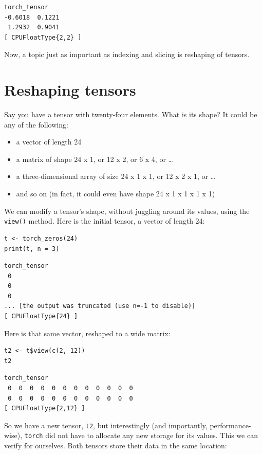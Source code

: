 \documentclass[
  letterpaper,
]{krantz}
\begin{document}
\begin{verbatim}
torch_tensor
-0.6018  0.1221
 1.2932  0.9041
[ CPUFloatType{2,2} ]
\end{verbatim}

Now, a topic just as important as indexing and slicing is reshaping of
tensors.

\hypertarget{reshaping-tensors}{%
\section{\texorpdfstring{Reshaping
tensors}{Reshaping tensors}}\label{reshaping-tensors}}

Say you have a tensor with twenty-four elements. What is its shape? It
could be any of the following:

\begin{itemize}
\item
  a vector of length 24
\item
  a matrix of shape 24 x 1, or 12 x 2, or 6 x 4, or \ldots{}
\item
  a three-dimensional array of size 24 x 1 x 1, or 12 x 2 x 1, or
  \ldots{}
\item
  and so on (in fact, it could even have shape 24 x 1 x 1 x 1 x 1)
\end{itemize}

We can modify a tensor's shape, without juggling around its values,
using the \texttt{view()} method. Here is the initial tensor, a vector
of length 24:

\begin{verbatim}
t <- torch_zeros(24)
print(t, n = 3)
\end{verbatim}

\begin{verbatim}
torch_tensor
 0
 0
 0
... [the output was truncated (use n=-1 to disable)]
[ CPUFloatType{24} ]
\end{verbatim}

Here is that same vector, reshaped to a wide matrix:

\begin{verbatim}
t2 <- t$view(c(2, 12))
t2
\end{verbatim}

\begin{verbatim}
torch_tensor
 0  0  0  0  0  0  0  0  0  0  0  0
 0  0  0  0  0  0  0  0  0  0  0  0
[ CPUFloatType{2,12} ]
\end{verbatim}

So we have a new tensor, \texttt{t2}, but interestingly (and
importantly, performance-wise), \texttt{torch} did not have to allocate
any new storage for its values. This we can verify for ourselves. Both
tensors store their data in the same location:
\end{document}
